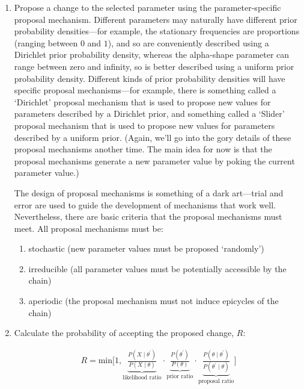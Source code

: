 \documentclass[11pt]{article}
\begin{document}
\begin{enumerate}
\item{Propose a change to the selected parameter using the parameter-specific proposal
mechanism. 
Different parameters may naturally have different prior probability densities---for example, the stationary frequencies are proportions (ranging between $0$ and $1$), and so are conveniently described using a Dirichlet prior probability density, whereas the alpha-shape parameter can range between zero and infinity, so is better described using a uniform prior probability density. 
Different kinds of prior probability densities will have specific proposal mechanisms---for example, there is something called a `Dirichlet’ proposal mechanism that is used to propose new values for parameters described by a Dirichlet prior, and something called a `Slider’ proposal mechanism that is used to propose new values for parameters described by a uniform prior. 
(Again, we’ll go into the gory details of these proposal mechanisms another time. 
The main idea for now is that the proposal mechanisms generate a new parameter value by poking the current parameter value.)

The design of proposal mechanisms is something of a dark art---trial and error are used to guide the development of mechanisms that work well. 
Nevertheless, there are basic criteria that the proposal mechanisms must meet. 
All proposal mechanisms must be:

\begin{enumerate}[i]
\item{stochastic (new parameter values must be proposed `randomly’)}

\item{irreducible (all parameter values must be potentially accessible by the chain)}

\item{aperiodic (the proposal mechanism must not induce epicycles of the chain)}
\end{enumerate}}

\item{Calculate the probability of accepting the proposed change, $R$:

\begin{align}
R = \text{min}\Bigg[1, \underbrace{\frac{P(X \mid \theta ^{\prime})}{P(X \mid \theta )}}_{\text{likelihood ratio}} \cdot \underbrace{\frac{ P(\theta ^{\prime})}{P(\theta)}}_\text{prior ratio} \cdot \underbrace{\frac{P(\theta \mid \theta ^{\prime})}{P(\theta ^{\prime} \mid \theta)}}_\text{proposal ratio} \Bigg]
\end{align}

}
\end{enumerate}
\end{document}
